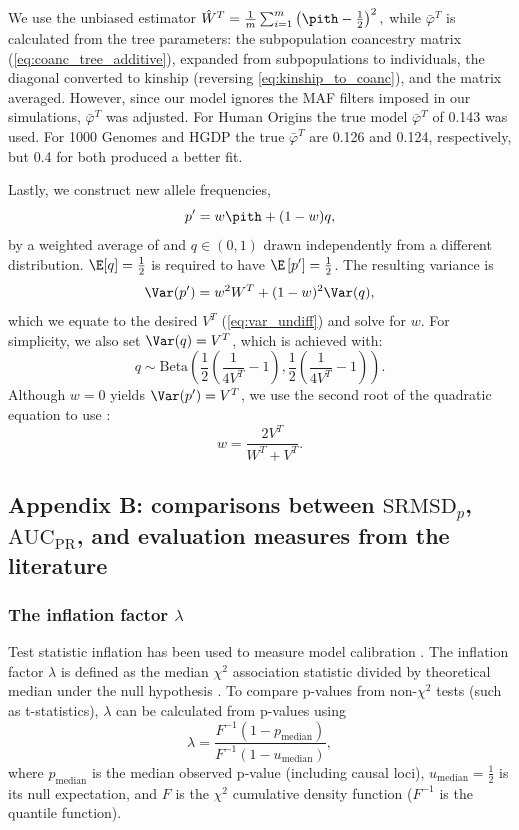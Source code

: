\documentclass[11pt]{article}
\newcommand{\rmsd}{\text{SRMSD}_p}
\newcommand{\auc}{\text{AUC}_\text{PR}}
\begin{document}
We use the unbiased estimator
$
\hat{W}^T
=
\frac{1}{m} \sum_{i=1}^m \left( \pith - \frac{1}{2} \right)^2
,
$
while $\bar{\varphi}^T$ is calculated from the tree parameters: the subpopulation coancestry matrix (\cref{eq:coanc_tree_additive}), expanded from subpopulations to individuals, the diagonal converted to kinship (reversing \cref{eq:kinship_to_coanc}), and the matrix averaged.
However, since our model ignores the MAF filters imposed in our simulations, $\bar{\varphi}^T$ was adjusted.
For Human Origins the true model $\bar{\varphi}^T$ of 0.143 was used.
For 1000 Genomes and HGDP the true $\bar{\varphi}^T$ are 0.126 and 0.124, respectively, but 0.4 for both produced a better fit.

Lastly, we construct new allele frequencies,
$$
p' = w \pith + ( 1 - w ) q,
$$
by a weighted average of \pith and $q \in (0, 1)$ drawn independently from a different distribution.
$\E[q] = \frac{1}{2}$ is required to have $\E \left[ p' \right] = \frac{1}{2}$.
The resulting variance is
$$
\Var(p')
=
w^2 W^T + (1-w)^2 \Var(q)
,
$$
which we equate to the desired $V^T$ (\cref{eq:var_undiff}) and solve for $w$.
For simplicity, we also set $\Var(q) = V^T$, which is achieved with:
$$
q \sim \text{Beta} \left( \frac{1}{2} \left( \frac{1}{ 4 V^T } - 1 \right), \frac{1}{2} \left( \frac{1}{ 4 V^T } - 1 \right) \right)
.
$$
Although $w=0$ yields $\Var(p') = V^T$, we use the second root of the quadratic equation to use \pith:
$$
w = \frac{ 2 V^T }{ W^T + V^T }.
$$



\subsection{Appendix B: comparisons between $\rmsd$, $\auc$, and evaluation measures from the literature}

\subsubsection{The inflation factor $\lambda$}

Test statistic inflation has been used to measure model calibration \citep{astle_population_2009, price_new_2010}.
The inflation factor $\lambda$ is defined as the median $\chi^2$ association statistic divided by theoretical median under the null hypothesis \citep{devlin_genomic_1999}.
To compare p-values from non-$\chi^2$ tests (such as t-statistics), $\lambda$ can be calculated from p-values using
$$
\lambda
=
\frac{
  F^{-1} \left( 1 - p_\text{median} \right)
}{
  F^{-1} \left( 1 - u_\text{median} \right)
}
,
$$
where $p_\text{median}$ is the median observed p-value (including causal loci),
$u_\text{median} = \frac{1}{2}$ is its null expectation,
and $F$ is the $\chi^2$ cumulative density function ($F^{-1}$ is the quantile function).
\end{document}
